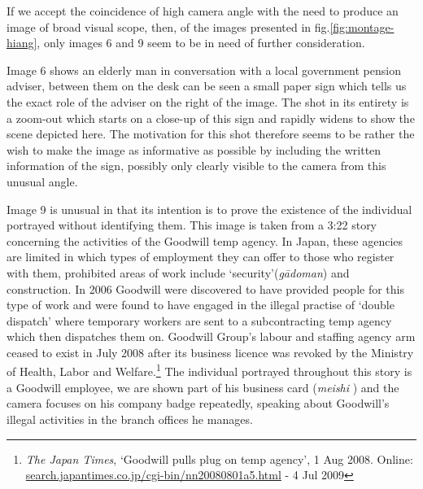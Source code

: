 \medskip

If we accept the coincidence of high camera angle with the need to produce an image of broad visual scope, then, of the images presented in fig.\ref{fig:montage-hiang}, only images 6 and 9 seem to be in need of further consideration. 

Image 6 shows an elderly man in conversation with a local government pension adviser, between them on the desk can be seen a small paper sign which tells us the exact role of the adviser on the right of the image. The shot in its entirety is a zoom-out which starts on a close-up of this sign and rapidly widens to show the scene depicted here. The motivation for this shot therefore seems to be rather the wish to make the image as informative as possible by including the written information of the sign, possibly only clearly visible to the camera from this unusual angle.

\medskip

Image 9 is unusual in that its intention is to prove the existence of the individual portrayed without identifying them. This image is taken from a 3:22 story concerning the activities of the Goodwill temp agency. In Japan, these agencies are limited in which types of employment they can offer to those who register with them, prohibited areas of work include `security'(\textit{g\={a}doman}) and construction. In 2006 Goodwill were discovered to have provided people for this type of work and were found to have engaged in the illegal practise of `double dispatch' where temporary workers are sent to a subcontracting temp agency which then dispatches them on. Goodwill Group's labour and staffing agency arm ceased to exist in July 2008 after its business licence was revoked by the Ministry of Health, Labor and Welfare.\footnote{\textit{The Japan Times}, `Goodwill pulls plug on temp agency', 1 Aug 2008. \newline Online: \url{search.japantimes.co.jp/cgi-bin/nn20080801a5.html} - 4 Jul 2009} The individual portrayed throughout this story is a Goodwill employee, we are shown part of his business card (\textit{meishi} ) and the camera focuses on his company badge repeatedly, speaking about Goodwill's illegal activities in the branch offices he manages.

